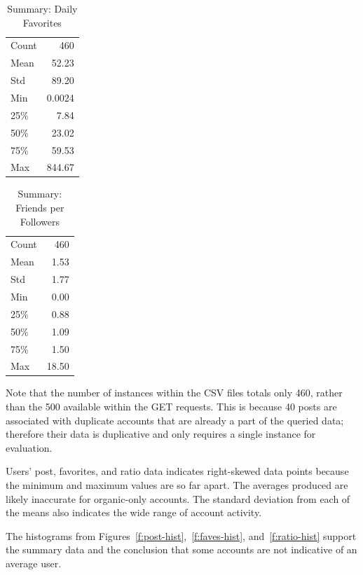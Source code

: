 \begin{table}[htb]
\centering
\caption{Summary: Daily Favorites}
\label{t:faves-summary}
\begin{tabular}{lr}
Count & 460  \\
Mean  & 52.23  \\
Std   & 89.20  \\
Min   & 0.0024 \\
25\%  & 7.84   \\
50\%  & 23.02  \\
75\%  & 59.53  \\
Max   & 844.67
\end{tabular}
\end{table}

\begin{table}[htb]
\centering
\caption{Summary: Friends per Followers}
\label{t:ratio-summary}
\begin{tabular}{lr}
Count & 460 \\
Mean  & 1.53   \\
Std   & 1.77   \\
Min   & 0.00   \\
25\%  & 0.88   \\
50\%  & 1.09   \\
75\%  & 1.50   \\
Max   & 18.50 
\end{tabular}
\end{table}

Note that the number of instances within the CSV files totals only 460, rather
than the 500 available within the GET requests. This is because 40 posts are
associated with duplicate accounts that are already a part of the queried data;
therefore their data is duplicative and only requires a single instance for
evaluation. 

Users' post, favorites, and ratio data indicates right-skewed data points
because the minimum and maximum values are so far apart. The averages produced
are likely inaccurate for organic-only accounts. The standard deviation from
each of the means also indicates the wide range of account activity.

The histograms from Figures~\ref{f:post-hist},~\ref{f:faves-hist},
and~\ref{f:ratio-hist} support the summary data and the conclusion that some
accounts are not indicative of an average user.


